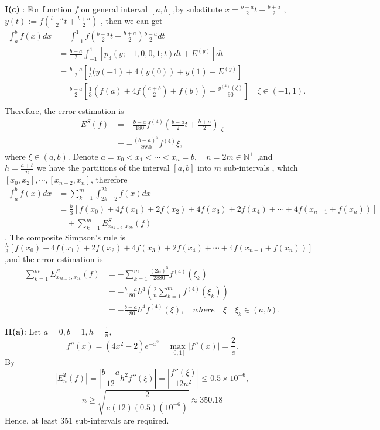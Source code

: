 \documentclass{article}
\begin{document}
\textbf{I(c)} : For function $f$ on general interval $[a,b]$,by substitute $ x = \frac{b-a}{2}t + \frac{b+a}{2}$ , $y(t) := f(\frac{b-a}{2}t + \frac{b+a}{2})$ , then we can get 
\begin{align*}
    \int_a^b f(x)dx & = \int_{-1}^1 f(\frac{b-a}{2}t + \frac{b+a}{2})\frac{b-a}{2}dt \\
    & = \frac{b-a}{2} \int_{-1}^1 [p_3(y;-1,0,0,1;t)dt + E^(y) ]dt \\
    & = \frac{b-a}{2}[\frac{1}{3}(y(-1)+4(y(0))+y(1) + E^(y)] \\
    & = \frac{b-a}{2}[\frac{1}{3}(f(a)+4f(\frac{a+b}{2})+f(b)) - \frac{y^{(4)}(\zeta)}{90}] \quad \zeta \in (-1,1).   \\
\end{align*}
Therefore, the error estimation is 
\begin{align*}
    E^S(f) & = -\frac{b-a}{180} f^{(4)}(\frac{b-a}{2}t + \frac{b+a}{2})|_{\zeta} \\
    & = -\frac{(b-a)^5}{2880}f^{(4)}\xi ,
\end{align*}
where $\xi \in (a,b)$.
Denote $a = x_0 < x_1 < \cdots < x_n = b , \quad  n=2m \in \mathbb{N}^+ $ ,and $h =\frac{a+b}{n}$ we have the partitions of the interval $[a,b]$ into $m$ sub-intervals , which $ [x_0,x_2], \cdots , [x_{n-2},x_n]$, therefore 
\begin{align*}
    \int_a^bf(x)dx & = \displaystyle\sum_{k=1}^{m}\int_{2k-2}^{2k}f(x)dx \\ 
    & = \frac{h}{3}[f(x_0)+4f(x_1)+2f(x_2)+4f(x_3)+2f(x_4)+\cdots+4f(x_{n-1}+f(x_n))] \\
    & \quad + \displaystyle\sum_{k=1}^{m}E_{x_{2k-2},x_{2k}}^S(f)
\end{align*}.
The composite Simpson's rule is $\frac{h}{3}[f(x_0)+4f(x_1)+2f(x_2)+4f(x_3)+2f(x_4)+\cdots+4f(x_{n-1}+f(x_n))]$,and the error estimation is
\begin{align*}
    \displaystyle\sum_{k=1}^mE_{x_{2k-2},x_{2k}}^S(f) & = -\displaystyle\sum_{k=1}^m\frac{(2h)^5}{2880}f^{(4)}(\xi_k)\\
    & = -\frac{b-a}{180}h^4(\frac{2}{n}\sum_{k=1}^mf^{(4)}(\xi_k))\\
    & = -\frac{b-a}{180}h^4f^{(4)}(\xi), \quad where \quad \xi \quad \xi_k \in (a,b).
\end{align*}

\textbf{II(a)}: Let $a=0,b=1,h=\frac{1}{n}$,
\begin{equation*}
    f''(x) = (4x^2-2)e^{-x^2} \quad \max_{[0,1]}|f''(x)| = \frac{2}{e}.
\end{equation*}
By 
\begin{equation*}
    |E_n^T(f)|= |\frac{b-a}{12}h^2f''(\xi)|=|\frac{f''(\xi)}{12n^2}| \leq 0.5 \times 10^{-6},
\end{equation*}
\begin{equation*}
    n\geq \sqrt{\frac{2}{e(12)(0.5)(10^{-6})}} \approx 350.18
\end{equation*}
Hence, at least 351 sub-intervals are required.
\end{document}
